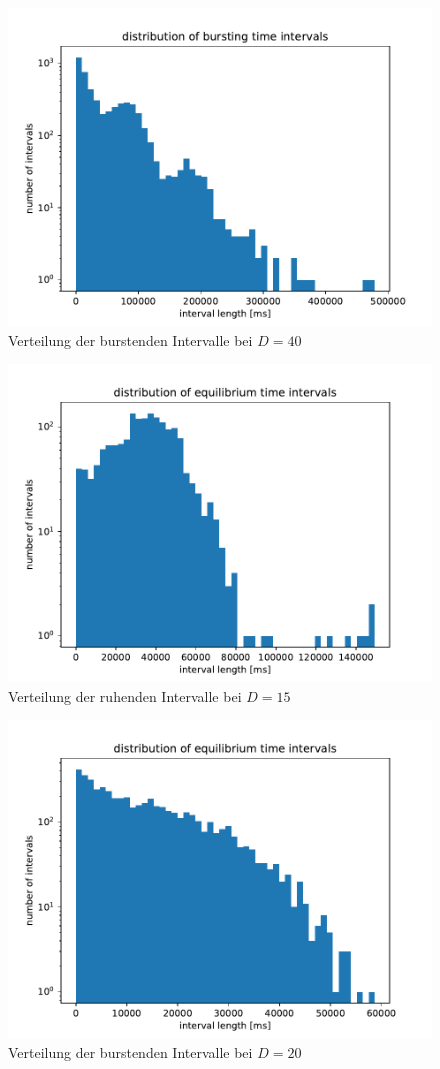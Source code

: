 \documentclass[12pt,a4paper]{article}
\begin{document}
\begin{figure}[H]
	\centering
	\includegraphics[scale=1]{bdistajrj2realrinzelpoi26n14003.pdf}\caption{Verteilung der burstenden Intervalle bei $D=40$}
	\label{b4003}
\end{figure}
\begin{figure}[H]
	\centering
	\includegraphics[scale=1]{eqdistajrj2realrinzelpoi26n11501.pdf}\caption{Verteilung der ruhenden Intervalle bei $D=15$}
	\label{eq1501}
\end{figure}
\begin{figure}[H]
	\centering
	\includegraphics[scale=1]{eqdistajrj2realrinzelpoi26n12001.pdf}\caption{Verteilung der burstenden Intervalle bei $D=20$}
	\label{eq2001}
\end{figure}
\end{document}
